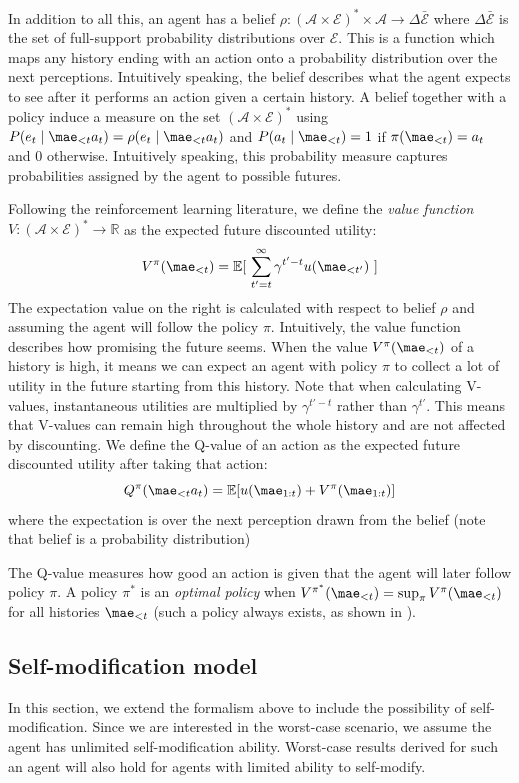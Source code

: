 	In addition to all this, an agent has a belief $\rho \colon (\mathcal{A \times E})^* \times \mathcal{A} \to \Delta \bar{\mathcal{E}}$ where $\Delta \bar{\mathcal{E}}$ is the set of full-support probability distributions over $\mathcal{E}$. This is a function which maps any history ending with an action onto a probability distribution over the next perceptions. Intuitively speaking, the belief describes what the agent expects to see after it performs an action given a certain history. A belief together with a policy induce a measure on the set $(\mathcal{A \times E})^*$ using $P(e_t \mid \mae_{< t}a_t) = \rho(e_t \mid \mae_{< t}a_t)$  and $P(a_t \mid \mae_{< t}) = 1$ if $\pi(\mae_{<t})=a_t$ and 0 otherwise. Intuitively speaking, this probability measure captures probabilities assigned by the agent to possible futures.
	
	Following the reinforcement learning literature, we define the \textit{value function} $V\colon (\mathcal{A \times E})^* \to \mathbb{R}$ as the expected future discounted utility:
	\[ V^\pi(\mae_{<t})=\mathbb{E}[\ \sum_{t'=t}^\infty \gamma^{t'-t}u(\mae_{<t'}) \ ]\]
	The expectation value on the right is calculated with respect to belief $\rho$ and assuming the agent will follow the policy $\pi$. Intuitively, the value function describes how promising the future seems. When the value \(V^\pi(\mae_{<t})\) of a history is high, it means we can expect an agent with policy $\pi$ to collect a lot of utility in the future starting from this history. Note that when calculating V-values, instantaneous utilities are multiplied by \(\gamma^{t'-t}\)  rather than  \(\gamma^{t'}\). This means that V-values can remain high throughout the whole history and are not affected by discounting. We define the Q-value of an action as the expected future discounted utility after taking that action:
	\[ Q^\pi(\mae_{<t} a_t)=\mathbb{E}[u(\mae_{1:t}) + V^{\pi}(\mae_{1:t})] \]
	where the expectation is over the next perception drawn from the belief (note that belief is a probability distribution)

	The Q-value measures how good an action is given that the agent will later follow policy $\pi$. A policy $\pi^*$ is an \textit{optimal policy} when $V^{\pi^*}(\mae_{<t}) = \sup_{\pi} V^{\pi}(\mae_{<t})$ for all histories $\mae_{<t}$ (such a policy always exists, as shown in \cite{Lattimore2014}). 	
	\subsection{Self-modification model}
	In this section, we extend the formalism above to include the possibility of self-modification. Since we are interested in the worst-case scenario, we assume the agent has unlimited self-modification ability. Worst-case results derived for such an agent will also hold for agents with limited ability to self-modify.
	
